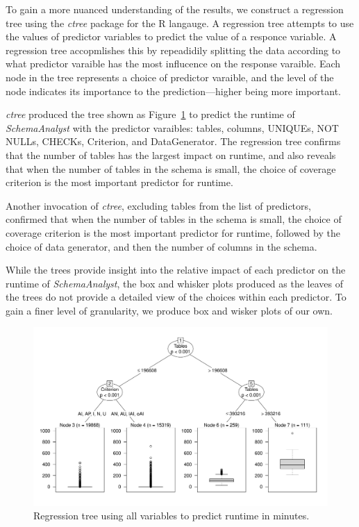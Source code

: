 
To gain a more nuanced understanding of the results, we construct a
regression tree using the \textit{ctree} package for the R langauge. A
regression tree attempts to use the values of predictor variables to
predict the value of a responce variable. A regression tree accopmlishes
this by repeadidily splitting the data according to what predictor varaible has the
most influcence on the response varaible. Each node in the tree represents a choice
of predictor varaible, and the level of the node indicates its
importance to the prediction---higher being more important.

\textit{ctree} produced the tree shown as Figure~\ref{fig:atree} to
predict the runtime of \textit{SchemaAnalyst} with the predictor varaibles:
tables, columns, UNIQUEs, NOT NULLs, CHECKs, Criterion, and
DataGenerator. The regression tree confirms that the number of
tables has the largest impact on runtime, and also reveals that when the number of tables in the schema is small, 
the choice of coverage criterion is the most important predictor for runtime.

Another invocation of \textit{ctree}, excluding tables from the list of
predictors, confirmed that when the number of tables in the schema is small, the choice of coverage criterion is the
most important predictor for runtime, followed by the choice of data
generator, and then the number of columns in the schema.

While the trees provide insight into the relative impact of each
predictor on the runtime of \textit{SchemaAnalyst}, the box and whisker
plots produced as the leaves of the trees do not provide a detailed view
of the choices within each predictor.  To gain a finer level of
granularity, we produce box and wisker plots of our own.

\begin{figure}
\centering
  \centering
  \includegraphics[width=.75\linewidth]{diagrams/AllTree.pdf}
  \caption{Regression tree using all variables to predict runtime in
  minutes. \vspace{-.15in}}
  \label{fig:atree}
  \vspace{-.15in}
\end{figure}

